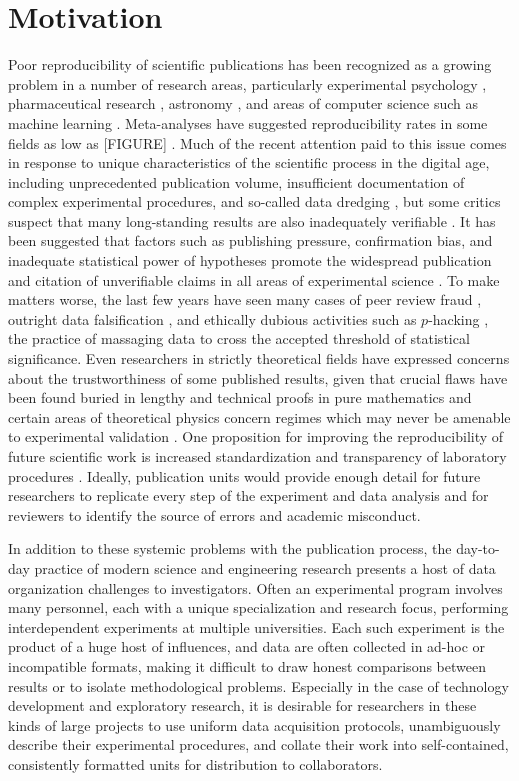 \chapter{Motivation}

Poor reproducibility of scientific publications has been
recognized as a growing problem in a number of research areas,
particularly experimental psychology \cite{}, pharmaceutical research
\cite{}, astronomy \cite{}, and areas of computer science such as
machine learning \cite{}. Meta-analyses have suggested reproducibility rates
in some fields as low as [FIGURE] \cite{}. Much of the recent
attention paid to this issue comes in response to unique
characteristics of the scientific process in the digital age,
including unprecedented publication volume, insufficient documentation
of complex experimental procedures, and so-called data dredging
\cite{}, but some critics suspect that many long-standing results
are also inadequately verifiable \cite{}. It has been suggested that
factors such as publishing pressure, confirmation bias, and inadequate
statistical power of hypotheses promote the widespread publication and
citation of unverifiable claims in all areas of experimental science
\cite{}. To make matters worse, the last few years have seen many
cases of peer review fraud \cite{}, outright
data falsification \cite{}, and ethically dubious activities such as
$p$-hacking \cite{}, the practice of massaging data to cross the
accepted threshold of statistical significance. Even researchers in
strictly theoretical fields have expressed concerns about the
trustworthiness of some published results, given that crucial flaws
have been found buried in lengthy and technical proofs in pure
mathematics \cite{} and certain areas of theoretical physics concern
regimes which may never be amenable to experimental validation
\cite{}. One proposition for improving the reproducibility of future
scientific work is increased standardization and
transparency of laboratory procedures \cite{}. Ideally, publication
units would provide enough detail for future researchers to replicate
every step of the experiment and data analysis and for reviewers to
identify the source of errors and academic misconduct.

In addition to these systemic problems with the publication process,
the day-to-day practice of modern science and engineering research
presents a host of data organization challenges to
investigators. Often an experimental program involves many personnel,
each with a unique specialization and research focus, performing
interdependent experiments at multiple universities. Each such experiment is
the product of a huge host of influences, and data are often collected
in ad-hoc or incompatible formats, making it difficult to draw honest
comparisons between results or to isolate methodological
problems. Especially in the case of technology development and
exploratory research, it is desirable for researchers in these kinds
of large projects to use uniform data acquisition protocols,
unambiguously describe their experimental procedures, and collate
their work into self-contained, consistently formatted units for
distribution to collaborators.


